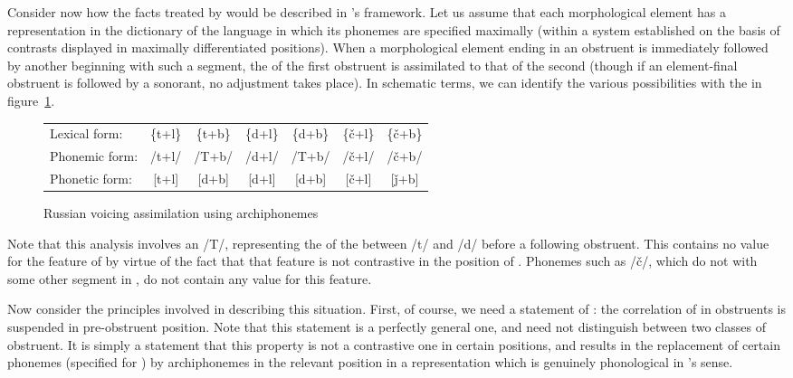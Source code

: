 Consider now how the facts treated by {\Halle} would be described in
{\Trubetzkoy}'s framework. Let us assume that each morphological element has a
representation in the dictionary of the language in which its phonemes
are specified maximally (within a system established on the basis of
contrasts displayed in maximally differentiated positions). When a
morphological element ending in an obstruent is immediately followed
by another beginning with such a segment, the  of the first
obstruent is assimilated to that of the second (though if an
element-final obstruent is followed by a sonorant, no adjustment takes
place). In schematic terms, we can identify the various possibilities
with the  in figure~\ref{fig:ch.prague_voicing}.

\begin{figure}[h]
  \centering
  \begin{tabular}{lcccccc}
    Lexical form:& \{t+l\}& \{t+b\}& \{d+l\}& \{d+b\}& \{č+l\}&
                                                                \{č+b\}\\
    Phonemic form:& /t+l/& /T+b/& /d+l/& /T+b/& /č+l/& /č+b/ \\
    Phonetic form:& [t+l]& [d+b]& [d+l]& [d+b]& [č+l]& [ǰ+b]
  \end{tabular}
  \caption{Russian voicing assimilation using archiphonemes}
  \label{fig:ch.prague_voicing}
\end{figure}

Note that this analysis involves an  /T/, representing the
 of the  between /t/ and /d/ before a following
obstruent. This  contains no value for the feature of
 by virtue of the fact that that feature is not contrastive in
the position of . Phonemes such as /č/, which do not
 with some other segment in , do not contain any value
for this feature.

Now consider the principles involved in describing this
situation. First, of course, we need a statement of :
the correlation of  in obstruents is suspended in pre-obstruent
position. Note that this statement is a perfectly general one, and
need not distinguish between two classes of obstruent. It is simply a
statement that this property is not a contrastive one in certain
positions, and results in the replacement of certain phonemes
(specified for ) by archiphonemes in the relevant position in a
representation which is genuinely phonological in {\Trubetzkoy}'s sense.

